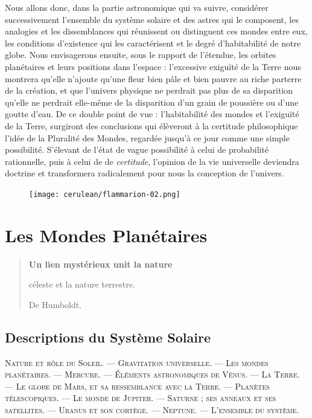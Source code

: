 \documentclass[a4paper, 11pt, oneside, landscape]{article}
\begin{document}
Nous allons donc, dans la partie astronomique qui va suivre, considérer successivement l'ensemble du système solaire et des astres qui le composent, les analogies et les dissemblances qui réunissent ou distinguent ces mondes entre eux, les conditions d'existence qui les caractérisent et le degré d'habitabilité de notre globe. Nous envisagerons ensuite, sous le rapport de l'étendue, les orbites planétaires et leurs positions dans l'espace : l'excessive exiguïté de la Terre nous montrera qu'elle n'ajoute qu'une fleur bien pâle et bien pauvre au riche parterre de la création, et que l'univers physique ne perdrait pas plus de sa disparition qu'elle ne perdrait elle-même de la disparition d'un grain de poussière ou d'une goutte d'eau. De ce double point de vue : l'habitabilité des mondes et l'exiguïté de la Terre, surgiront des conclusions qui élèveront à la certitude philosophique l'idée de la Pluralité des Mondes, regardée jusqu'à ce jour comme une simple possibilité. S'élevant de l'état de vague possibilité à celui de probabilité rationnelle, puis à celui de de \emph{certitude}, l'opinion de la vie universelle deviendra doctrine et transformera radicalement pour nous la conception de l'univers.
\clearpage
\vspace*{\fill}
\begin{figure}[H]
\centering
\texttt{[image: cerulean/flammarion-02.png]}
\end{figure}
\vspace*{\fill}
\clearpage
\section{Les Mondes Planétaires}
\begin{quotation}\bfseries\small
Un lien mystérieux unit la nature

céleste et la nature terrestre.

\hspace*{5mm}De Humboldt.
\end{quotation}

\bigskip

\subsection{Descriptions du Système Solaire}
\begin{center}
\scshape
\small
Nature et rôle du Soleil. --- Gravitation universelle. --- Les mondes planétaires. --- Mercure. --- Éléments astronomiques de Vénus. --- La Terre. --- Le globe de Mars, et sa ressemblance avec la Terre. --- Planètes télescopiques. --- Le monde de Jupiter. --- Saturne ; ses anneaux et ses satellites. --- Uranus et son cortège. --- Neptune. --- L'ensemble du système.
\end{center}
\end{document}
